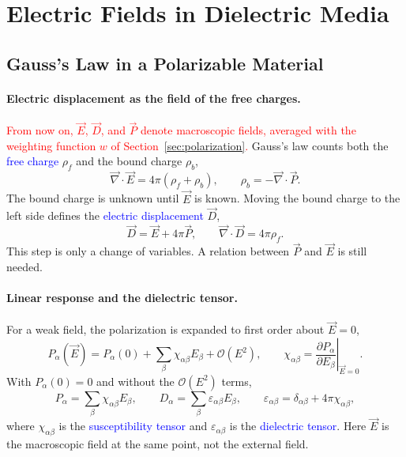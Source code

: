 \section{Electric Fields in Dielectric Media}
\label{sec:dielectric}

\subsection{Gauss's Law in a Polarizable Material}

\paragraph{Electric displacement as the field of the free charges.}
\textcolor{red}{From now on, $\vec E$, $\vec D$, and $\vec P$ denote macroscopic fields, averaged with the weighting function $w$ of Section~\ref{sec:polarization}.} Gauss's law counts both the \textcolor{blue}{free charge} $\rho_f$ and the bound charge $\rho_b$,
\begin{equation*}
    \vec\nabla\cdot\vec E = 4\pi(\rho_f + \rho_b), \qquad \rho_b = -\vec\nabla\cdot\vec P.
\end{equation*}
The bound charge is unknown until $\vec E$ is known. Moving the bound charge to the left side defines the \textcolor{blue}{electric displacement} $\vec D$,
\begin{equation}
    \boxed{
    \vec D = \vec E + 4\pi\vec P, \qquad \vec\nabla\cdot\vec D = 4\pi\rho_f.
    }
\end{equation}
This step is only a change of variables. A relation between $\vec P$ and $\vec E$ is still needed.

\paragraph{Linear response and the dielectric tensor.}
For a weak field, the polarization is expanded to first order about $\vec E = 0$,
\begin{equation*}
    P_\alpha(\vec E) = P_\alpha(0) + \sum_\beta \chi_{\alpha\beta}E_\beta + \mathcal{O}(E^2),
    \qquad
    \chi_{\alpha\beta} = \left.\frac{\partial P_\alpha}{\partial E_\beta}\right|_{\vec E = 0}.
\end{equation*}
With $P_\alpha(0) = 0$ and without the $\mathcal{O}(E^2)$ terms,
\begin{equation}
    \boxed{
    P_\alpha = \sum_\beta \chi_{\alpha\beta}E_\beta, \qquad
    D_\alpha = \sum_\beta \varepsilon_{\alpha\beta}E_\beta, \qquad
    \varepsilon_{\alpha\beta} = \delta_{\alpha\beta} + 4\pi\chi_{\alpha\beta},
    }
\end{equation}
where $\chi_{\alpha\beta}$ is the \textcolor{blue}{susceptibility tensor} and $\varepsilon_{\alpha\beta}$ is the \textcolor{blue}{dielectric tensor}. Here $\vec E$ is the macroscopic field at the same point, not the external field.

